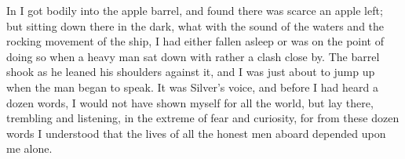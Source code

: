 In I got bodily into the apple barrel, and found there was scarce an apple left; but sitting down there in the dark, what with the sound of the waters and the rocking movement of the ship, I had either fallen asleep or was on the point of doing so when a heavy man sat down with rather a clash close by. The barrel shook as he leaned his shoulders against it, and I was just about to jump up when the man began to speak. It was Silver’s voice, and before I had heard a dozen words, I would not have shown myself for all the world, but lay there, trembling and listening, in the extreme of fear and curiosity, for from these dozen words I understood that the lives of all the honest men aboard depended upon me alone.